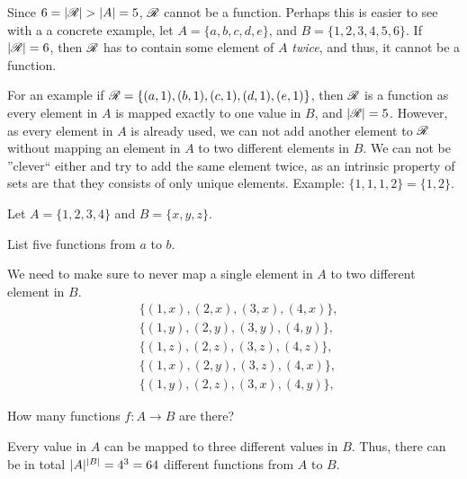 \documentclass[a4paper, english, 12pt]{article} %
\begin{document}
\begin{answer}
  Since $6 = \lvert\mathscr{R}\rvert > \lvert A\rvert = 5$, $\mathscr{R}$ cannot be a function. Perhaps this
  is easier to see with a a concrete example, let $A = \{a,b,c,d,e\}$, and $B =
  \{1,2,3,4,5,6\}$. If $\lvert\mathscr{R}\rvert=6$, then $\mathscr{R}$ has to contain some element of
  $A$ \emph{twice}, and thus, it cannot be a function.

  For an example if
$\mathscr{R} = \{ (a,1), (b,1), (c,1), (d,1), (e,1) \}$, then $\mathscr{R}$ is a function as every
element in $A$ is mapped exactly to one value in $B$, and $\lvert\mathscr{R}\rvert= 5$.
However, as every element in $A$ is already used, we can not add another element
to $\mathscr{R}$ without mapping an element in $A$ to two different elements in $B$.
We can not be ''clever`` either and try to add the same element twice, as an intrinsic
property of sets are that they consists of only unique elements. Example:
$\{1,1,1,2\} = \{1,2\}$.
\end{answer}

\begin{problem}[3]
  Let $A = \{1, 2, 3, 4\}$ and $B = \{x, y, z\}$.
\end{problem}


\begin{subproblem}
  List five functions from $a$ to $b$.
\end{subproblem}

\begin{answer}
  \noindent
  We need to make sure to never map a single element in $A$ to two
  different element in $B$.
  \begin{align*}
  & \{ (1,x), (2,x), (3,x), (4,x) \}, \\
  & \{ (1,y), (2,y), (3,y), (4,y) \},  \\
  & \{ (1,z), (2,z), (3,z), (4,z) \}, \\
  & \{ (1,x), (2,y), (3,z), (4,x) \}, \\
  & \{ (1,y), (2,z), (3,x), (4,y) \}, 
  \end{align*}
\end{answer}

\begin{subproblem}
  How many functions $f \colon A \to B$ are there?
\end{subproblem}

\begin{answer}
  Every value in $A$ can be mapped to three different values in $B$. Thus, there
  can be in total $\lvert A\rvert^{\lvert B\rvert} = 4^3 = 64$ different functions from $A$ to
  $B$.
\end{answer}
\end{document}
